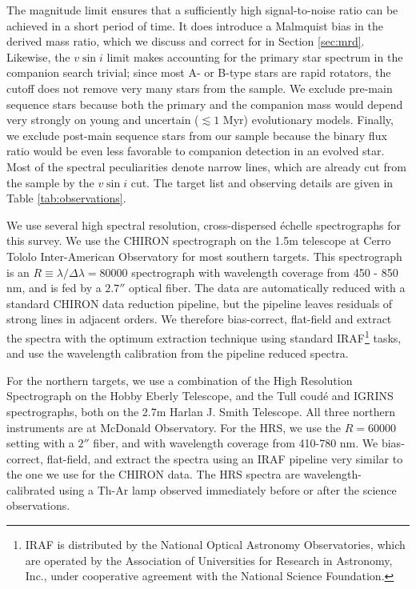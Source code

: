 \documentclass{emulateapj}
\begin{document}
The magnitude limit ensures that a sufficiently high signal-to-noise ratio can be achieved in a short period of time. It does introduce a Malmquist bias in the derived mass ratio, which we discuss and correct for in Section \ref{sec:mrd}. Likewise, the $v\sin{i}$ limit makes accounting for the primary star spectrum in the companion search trivial; since most A- or B-type stars are rapid rotators, the cutoff does not remove very many stars from the sample. We exclude pre-main sequence stars because both the primary and the companion mass would depend very strongly on young and uncertain ($\lesssim 1$ Myr) evolutionary models. Finally, we exclude post-main sequence stars from our sample because the binary flux ratio would be even less favorable to companion detection in an evolved star. Most of the spectral peculiarities denote narrow lines, which are already cut from the sample by the $v\sin{i}$ cut. The target list and observing details are given in Table \ref{tab:observations}.

We use several high spectral resolution, cross-dispersed \'echelle spectrographs for this survey. We use the CHIRON spectrograph \citep{CHIRON} on the 1.5m telescope at Cerro Tololo Inter-American Observatory for most southern targets. This spectrograph is an $R\equiv \lambda / \Delta \lambda = 80000$ spectrograph with wavelength coverage from 450 - 850 nm, and is fed by a $2.7''$ optical fiber. The data are automatically reduced with a standard CHIRON data reduction pipeline, but the pipeline leaves residuals of strong lines in adjacent orders. We therefore bias-correct, flat-field and extract the spectra with the optimum extraction technique \citep{Horne1986} using standard IRAF\footnote{IRAF is distributed by the National Optical Astronomy Observatories, which are operated by the Association of Universities for Research in Astronomy, Inc., under cooperative agreement with the National Science Foundation.} tasks, and use the wavelength calibration from the pipeline reduced spectra.

For the northern targets, we use a combination of the High Resolution Spectrograph \citep[HRS,][]{HRS} on the Hobby Eberly Telescope, and the Tull coud\'e \citep[TS23,][]{TS23} and IGRINS \citep{IGRINS} spectrographs, both on the 2.7m Harlan J. Smith Telescope. All three northern instruments are at McDonald Observatory. For the HRS, we use the $R = 60000$ setting with a $2''$ fiber, and with wavelength coverage from 410-780 nm. We bias-correct, flat-field, and extract the spectra using an IRAF pipeline very similar to the one we use for the CHIRON data. The HRS spectra are wavelength-calibrated using a Th-Ar lamp observed immediately before or after the science observations.
\end{document}
